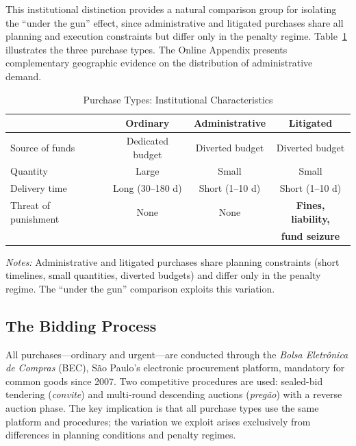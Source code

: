 This institutional distinction provides a natural comparison group for isolating the ``under the gun'' effect, since administrative and litigated purchases share all planning and execution constraints but differ only in the penalty regime. Table~\ref{tab:purchase_types} illustrates the three purchase types. The Online Appendix presents complementary geographic evidence on the distribution of administrative demand.

\begin{table}[ht]
  \centering
  \caption{Purchase Types: Institutional Characteristics}
  \label{tab:purchase_types}
  \small
  \begin{threeparttable}
  \begin{tabular}{lccc}
    \toprule
    & Ordinary & Administrative & Litigated \\
    \midrule
    Source of funds     & Dedicated budget & Diverted budget & Diverted budget \\
    Quantity            & Large            & Small           & Small \\
    Delivery time       & Long (30--180 d) & Short (1--10 d) & Short (1--10 d) \\
    Threat of punishment & None            & None            & \textbf{Fines, liability,} \\
                        &                  &                 & \textbf{fund seizure} \\
    \bottomrule
  \end{tabular}
  \begin{tablenotes}
    \small
    \item \textit{Notes:} Administrative and litigated purchases share planning
    constraints (short timelines, small quantities, diverted budgets) and differ
    only in the penalty regime. The ``under the gun'' comparison exploits this
    variation.
  \end{tablenotes}
  \end{threeparttable}
\end{table}

\subsection{The Bidding Process}
\label{sec:bidding}

All purchases---ordinary and urgent---are conducted through the \textit{Bolsa Eletr\^onica de Compras} (BEC), S\~ao Paulo's electronic procurement platform, mandatory for common goods since 2007. Two competitive procedures are used: sealed-bid tendering (\textit{convite}) and multi-round descending auctions (\textit{preg\~ao}) with a reverse auction phase. The key implication is that all purchase types use the same platform and procedures; the variation we exploit arises exclusively from differences in planning conditions and penalty regimes.
